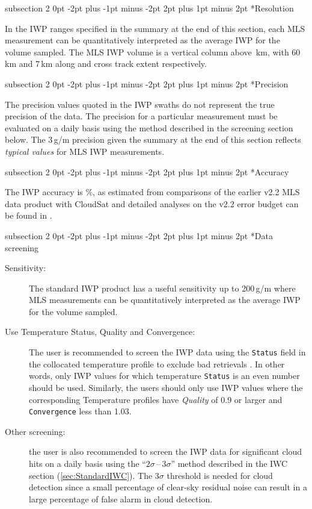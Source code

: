 \documentclass[11pt,draft]{report}
\makeatletter
\renewcommand{\subsection}{\@startsection%
  {subsection}%
  {2}%
  {0pt}%
  {-2pt plus -1pt minus -2pt}%
  {2pt plus 1pt minus 2pt}%
  {\large\sffamily\fontseries{sb}\selectfont\flushleft\color{SectionColor}\figureversion{tabular}}}%
\makeatother
\begin{document}
\subsection*{Resolution}

In the IWP ranges specified in the summary at the end of this section,
each MLS measurement can be quantitatively interpreted as the average
IWP for the volume sampled.  The MLS IWP volume is a vertical column
above \,km, with 60\,km and 7\,km along and cross track extent
respectively.

\subsection*{Precision}

The precision values quoted in the IWP swaths do not represent the true
precision of the data.  The precision for a particular measurement must
be evaluated on a daily basis using the method described in the
screening section below.  The 3\,g/m precision given the summary at
the end of this section reflects \emph{typical values} for MLS IWP
measurements.

\subsection*{Accuracy}

The IWP accuracy is \%, as estimated from comparisons 
of the earlier v2.2 MLS data product with CloudSat and 
detailed analyses on the v2.2 error budget can be found 
in \citet{WuEtal09}.

\subsection*{Data screening}
\label{sec:IWPScreening}
\begin{description}
\item[Sensitivity:] The standard IWP product has a useful sensitivity up
  to 200\,g/m where MLS measurements can be quantitatively
  interpreted as the average IWP for the volume sampled.
\item[Use Temperature Status, Quality and Convergence:] The user is
  recommended to screen the IWP data using the \texttt{Status} field in
  the collocated temperature profile to exclude bad retrievals
  \citep{SchwartzEtal08}. In other words, only IWP values for which
  temperature \texttt{Status} is an even number should be used.
  Similarly, the users should only use IWP values where the
  corresponding Temperature profiles have \emph{Quality} of 0.9 or
  larger and \texttt{Convergence} less than 1.03.
\item[Other screening:] the user is also recommended to screen the IWP
  data for significant cloud hits on a daily basis using the
  ``$2\sigma$\,--\,$3\sigma$'' method described in the IWC section
  (\ref{sec:StandardIWC}). The $3\sigma$ threshold is needed for cloud
  detection since a small percentage of clear-sky residual noise can
  result in a large percentage of false alarm in cloud detection.
\end{description}
\end{document}
